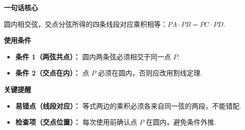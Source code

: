 \begin{summarybox}

	\textbf{\textcolor{CSummary}{一句话核心}}

	圆内相交弦，交点分弦所得的四条线段对应乘积相等：$PA\cdot PB = PC\cdot PD$.

	\medskip
	\textbf{\textcolor{CSummary}{使用条件}}
	\begin{itemize}[leftmargin=*, itemsep=0.5em, topsep=0.4em]
		\item \textbf{条件 1（两弦共点）：} 圆内两条弦必须相交于同一点 $P$.
		\item \textbf{条件 2（交点在内）：} 点 $P$ 必须在圆内，否则应改用割线定理.
	\end{itemize}

	\medskip
	\textbf{\textcolor{CSummary}{关键提醒}}
	\begin{itemize}[leftmargin=*, itemsep=0.5em, topsep=0.4em]
		\item \textbf{易错点（线段对应）：} 等式两边的乘积必须各来自同一弦的两段，不能错配.
		\item \textbf{检查项（交点位置）：} 每次使用前确认点 $P$ 在圆内，避免条件外推.
	\end{itemize}

\end{summarybox}
